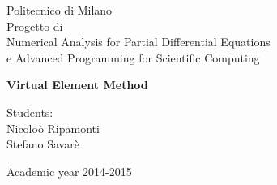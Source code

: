 \documentclass[oneside,12pt]{book}  %
\theoremstyle{plain}
\theoremstyle{definition}
\theoremstyle{remark}
\numberwithin{equation}{chapter} %
\begin{document}
\lstset{language=Matlab} 

\thispagestyle{empty}  %
\begin{center}  %
  {\Large Politecnico di Milano}\\[12pt]    %

  {\Huge Progetto di \\
  Numerical Analysis for Partial Differential Equations\\
  e Advanced Programming for Scientific Computing }
\end{center}


\begin{center}    %
  \Huge \bf Virtual Element Method
\end{center}
%
\vspace{12pt}
%
\begin{flushleft}
  \noindent\Large
  Students:\\
  Nicolo\`o Ripamonti \\
  Stefano Savar\`e\\
  
\end{flushleft}
%
%
\vspace{364pt}
%
\begin{center}
  \large
  Academic year 2014-2015
\end{center}

\newpage

\tableofcontents  %




\renewcommand{\baselinestretch}{1.5} %

 
\end{document}
